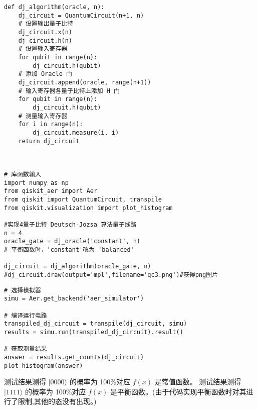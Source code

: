 \begin{py}
\begin{lstlisting}
def dj_algorithm(oracle, n):
    dj_circuit = QuantumCircuit(n+1, n)
    # 设置输出量子比特
    dj_circuit.x(n)
    dj_circuit.h(n)
    # 设置输入寄存器
    for qubit in range(n):
        dj_circuit.h(qubit)
    # 添加 Oracle 门
    dj_circuit.append(oracle, range(n+1))
    # 输入寄存器各量子比特上添加 H 门
    for qubit in range(n):
        dj_circuit.h(qubit)
    # 测量输入寄存器
    for i in range(n):
        dj_circuit.measure(i, i)
    return dj_circuit



# 库函数输入
import numpy as np
from qiskit_aer import Aer
from qiskit import QuantumCircuit, transpile
from qiskit.visualization import plot_histogram

#实现4量子比特 Deutsch-Jozsa 算法量子线路
n = 4
oracle_gate = dj_oracle('constant', n)
# 平衡函数时，'constant'改为 'balanced'

dj_circuit = dj_algorithm(oracle_gate, n)
#dj_circuit.draw(output='mpl',filename='qc3.png')#获得png图片
\end{lstlisting}
\end{py}

\begin{py}
\begin{lstlisting}
# 选择模拟器
simu = Aer.get_backend('aer_simulator')

# 编译运行电路
transpiled_dj_circuit = transpile(dj_circuit, simu)
results = simu.run(transpiled_dj_circuit).result()

# 获取测量结果
answer = results.get_counts(dj_circuit)
plot_histogram(answer)
\end{lstlisting}
\end{py}
测试结果测得 $|0000\rangle$ 的概率为 100\%对应 $f(x)$ 是常值函数。
测试结果测得 $|1111\rangle$ 的概率为 100\%对应 $f(x)$ 是平衡函数。(由于代码实现平衡函数时对其进行了限制,其他的态没有出现。)
